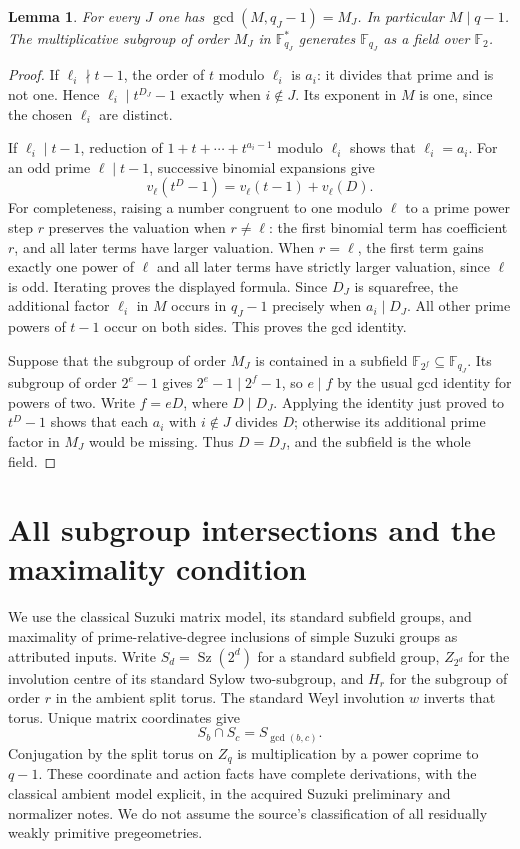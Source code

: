 \documentclass[11pt,a4paper]{article}
\newtheorem{lemma}{Lemma}
\newcommand{\Sz}{\operatorname{Sz}}
\newcommand{\F}{\mathbb F}
\begin{document}
\begin{lemma}\label{arithmetic}
For every $J$ one has $\gcd(M,q_J-1)=M_J$. In particular $M\mid q-1$.
The multiplicative subgroup of order $M_J$ in $\F_{q_J}^*$ generates
$\F_{q_J}$ as a field over $\F_2$.
\end{lemma}
\begin{proof}
If $\ell_i\nmid t-1$, the order of $t$ modulo $\ell_i$ is $a_i$:
it divides that prime and is not one. Hence
$\ell_i\mid t^{D_J}-1$ exactly when $i\notin J$. Its exponent in $M$
is one, since the chosen $\ell_i$ are distinct.

If $\ell_i\mid t-1$, reduction of
$1+t+\cdots+t^{a_i-1}$ modulo $\ell_i$ shows that $\ell_i=a_i$.
For an odd prime $\ell\mid t-1$, successive binomial expansions give
\[
 v_\ell(t^D-1)=v_\ell(t-1)+v_\ell(D).
\]
For completeness, raising a number congruent to one modulo $\ell$ to
a prime power step $r$ preserves the valuation when $r\ne\ell$:
the first binomial term has coefficient $r$, and all later terms have
larger valuation. When $r=\ell$, the first term gains exactly one
power of $\ell$ and all later terms have strictly larger valuation,
since $\ell$ is odd. Iterating proves the displayed formula.
Since $D_J$ is squarefree, the additional factor $\ell_i$ in $M$ occurs
in $q_J-1$ precisely when $a_i\mid D_J$. All other prime powers of
$t-1$ occur on both sides. This proves the gcd identity.

Suppose that the subgroup of order $M_J$ is contained in a subfield
$\F_{2^f}\subseteq\F_{q_J}$. Its subgroup of order $2^e-1$ gives
$2^e-1\mid2^f-1$, so $e\mid f$ by the usual gcd identity for powers
of two. Write $f=eD$, where $D\mid D_J$. Applying the identity just
proved to $t^D-1$ shows that each $a_i$ with $i\notin J$ divides $D$;
otherwise its additional prime factor in $M_J$ would be missing.
Thus $D=D_J$, and the subfield is the whole field.
\end{proof}

\section{All subgroup intersections and the maximality condition}
We use the classical Suzuki matrix model, its standard subfield groups,
and maximality of prime-relative-degree inclusions of simple Suzuki
groups as attributed inputs. Write $S_d=\Sz(2^d)$ for a standard
subfield group, $Z_{2^d}$ for the involution centre of its standard
Sylow two-subgroup, and $H_r$ for the subgroup of order $r$ in the
ambient split torus. The standard Weyl involution $w$ inverts that
torus. Unique matrix coordinates give
\[
 S_b\cap S_c=S_{\gcd(b,c)}.
\]
Conjugation by the split torus on $Z_q$ is multiplication by a power
coprime to $q-1$. These coordinate and action facts have complete
derivations, with the classical ambient model explicit, in the acquired
Suzuki preliminary and normalizer notes. We do not assume the source's
classification of all residually weakly primitive pregeometries.
\end{document}
